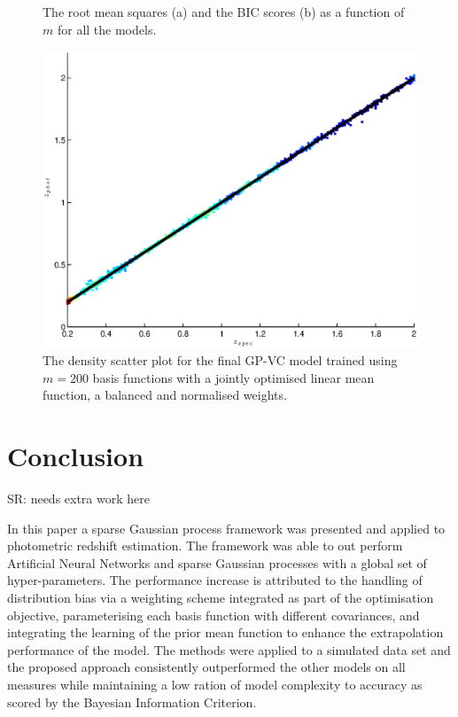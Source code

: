 \documentclass[useAMS,usenatbib,fleqn]{mn2e}
\begin{document}
\begin{figure}
       \caption{The root mean squares (a) and the BIC scores (b) as a function of $m$ for all the models.}
	
\end{figure}
\begin{figure}
       \centering
        \includegraphics[width=\columnwidth]{figures/final-model.eps}
        \caption{The density scatter plot for the final GP-VC model trained using $m=200$ basis functions with a jointly optimised linear mean function, a balanced and normalised weights. }
       \label{fig-final-model}
\end{figure}

\section{Conclusion}
\label{sec-conclusion}
SR: needs extra work here

In this paper a sparse Gaussian process framework was presented and applied to photometric redshift estimation. The framework was able to out perform Artificial Neural Networks and sparse Gaussian processes with a global set of hyper-parameters. The performance increase is attributed to the handling of distribution bias via a weighting scheme integrated as part of the optimisation objective, parameterising each basis function with different covariances, and integrating the learning of the prior mean function to enhance the extrapolation performance of the model. The methods were applied to a simulated data set and the proposed approach consistently outperformed the other models on all measures while maintaining a low ration of model complexity to accuracy as scored by the Bayesian Information Criterion.

\footnotesize{


}

\label{lastpage}
\end{document}
